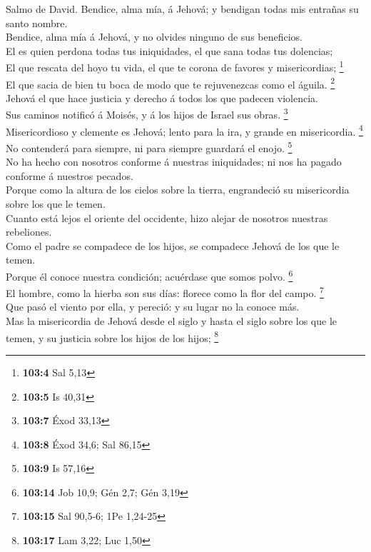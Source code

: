  Salmo de David. Bendice, alma mía, á Jehová; y bendigan
todas mis entrañas su santo nombre.\\
 Bendice, alma mía á Jehová, y no olvides ninguno de sus
beneficios.\\
 El es quien perdona todas tus iniquidades, el que sana
todas tus dolencias;\\
 El que rescata del hoyo tu vida, el que te corona de
favores y misericordias; \footnote{\textbf{103:4} Sal 5,13}\\
 El que sacia de bien tu boca de modo que te rejuvenezcas
como el águila. \footnote{\textbf{103:5} Is 40,31}\\
 Jehová el que hace justicia y derecho á todos los que
padecen violencia.\\
 Sus caminos notificó á Moisés, y á los hijos de Israel sus
obras. \footnote{\textbf{103:7} Éxod 33,13}\\
 Misericordioso y clemente es Jehová; lento para la ira, y
grande en misericordia. \footnote{\textbf{103:8} Éxod 34,6; Sal 86,15}\\
 No contenderá para siempre, ni para siempre guardará el
enojo. \footnote{\textbf{103:9} Is 57,16}\\
 No ha hecho con nosotros conforme á nuestras iniquidades;
ni nos ha pagado conforme á nuestros pecados.\\
 Porque como la altura de los cielos sobre la tierra,
engrandeció su misericordia sobre los que le temen.\\
 Cuanto está lejos el oriente del occidente, hizo alejar de
nosotros nuestras rebeliones.\\
 Como el padre se compadece de los hijos, se compadece
Jehová de los que le temen.\\
 Porque él conoce nuestra condición; acuérdase que somos
polvo. \footnote{\textbf{103:14} Job 10,9; Gén 2,7; Gén 3,19}\\
 El hombre, como la hierba son sus días: florece como la
flor del campo. \footnote{\textbf{103:15} Sal 90,5-6; 1Pe 1,24-25}\\
 Que pasó el viento por ella, y pereció: y su lugar no la
conoce más.\\
 Mas la misericordia de Jehová desde el siglo y hasta el
siglo sobre los que le temen, y su justicia sobre los hijos de los
hijos; \footnote{\textbf{103:17} Lam 3,22; Luc 1,50}\\
